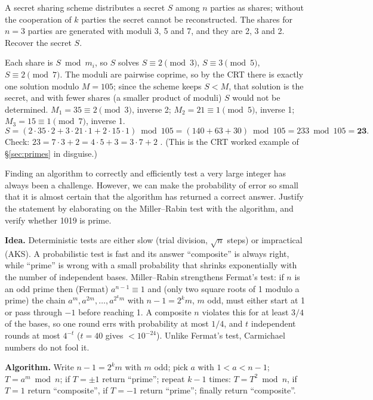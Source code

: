 \begin{keybox}[title={Q3 (5 marks)}]
A secret sharing scheme distributes a secret $S$ among $n$ parties as shares; without the cooperation of $k$ parties the secret cannot be reconstructed. The shares for $n = 3$ parties are generated with moduli 3, 5 and 7, and they are 2, 3 and 2. Recover the secret $S$.
\end{keybox}
Each share is $S \bmod m_i$, so $S$ solves $S \equiv 2 \pmod 3$, $S \equiv 3 \pmod 5$, $S \equiv 2 \pmod 7$. The moduli are pairwise coprime, so by the CRT there is exactly one solution modulo $M = 105$; since the scheme keeps $S < M$, that solution is the secret, and with fewer shares (a smaller product of moduli) $S$ would not be determined. $M_1 = 35 \equiv 2 \pmod 3$, inverse 2; $M_2 = 21 \equiv 1 \pmod 5$, inverse 1; $M_3 = 15 \equiv 1 \pmod 7$, inverse 1.
\[
S = (2 \cdot 35 \cdot 2 + 3 \cdot 21 \cdot 1 + 2 \cdot 15 \cdot 1) \bmod 105 = (140 + 63 + 30) \bmod 105 = 233 \bmod 105 = \mathbf{23}.
\]
Check: $23 = 7 \cdot 3 + 2 = 4 \cdot 5 + 3 = 3 \cdot 7 + 2$ \checkmark. (This is the CRT worked example of \S\ref{sec:primes} in disguise.)

\begin{keybox}[title={Q4 (7 marks)}]
Finding an algorithm to correctly and efficiently test a very large integer has always been a challenge. However, we can make the probability of error so small that it is almost certain that the algorithm has returned a correct answer. Justify the statement by elaborating on the Miller--Rabin test with the algorithm, and verify whether 1019 is prime.
\end{keybox}
\textbf{Idea.} Deterministic tests are either slow (trial division, $\sqrt n$ steps) or impractical (AKS). A probabilistic test is fast and its answer ``composite'' is always right, while ``prime'' is wrong with a small probability that shrinks exponentially with the number of independent bases. Miller--Rabin strengthens Fermat's test: if $n$ is an odd prime then (Fermat) $a^{n-1} \equiv 1$ and (only two square roots of 1 modulo a prime) the chain $a^m, a^{2m}, \dots, a^{2^k m}$ with $n - 1 = 2^k m$, $m$ odd, must either start at 1 or pass through $-1$ before reaching 1. A composite $n$ violates this for at least $3/4$ of the bases, so one round errs with probability at most $1/4$, and $t$ independent rounds at most $4^{-t}$ ($t = 40$ gives $< 10^{-24}$). Unlike Fermat's test, Carmichael numbers do not fool it.

\textbf{Algorithm.} Write $n - 1 = 2^k m$ with $m$ odd; pick $a$ with $1 < a < n - 1$; $T = a^m \bmod n$; if $T = \pm 1$ return ``prime''; repeat $k - 1$ times: $T = T^2 \bmod n$, if $T = 1$ return ``composite'', if $T = -1$ return ``prime''; finally return ``composite''.

